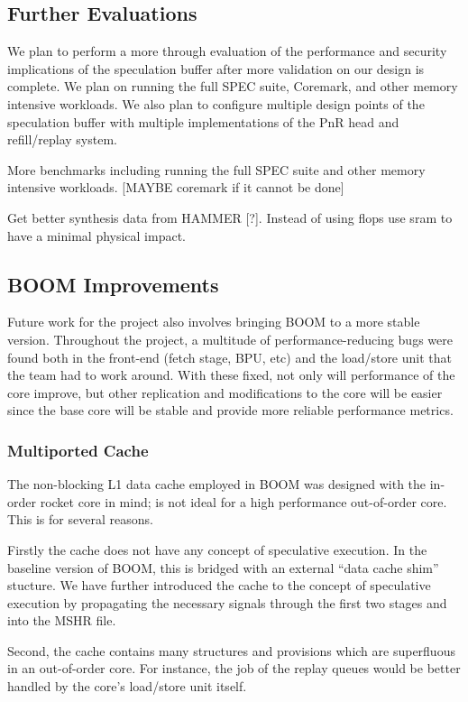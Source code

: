\subsection{Further Evaluations}
We plan to perform a more through evaluation of the performance and security implications of the
speculation buffer after more validation on our design is complete. We plan on running the full
SPEC suite, Coremark, and other memory intensive workloads. We also plan to configure multiple design
points of the speculation buffer with multiple implementations of the PnR head and refill/replay system.

More benchmarks including running the full SPEC suite and other memory intensive workloads. [MAYBE
coremark if it cannot be done]

Get better synthesis data from HAMMER [?]. Instead of using flops use sram to have a minimal 
physical impact.

\subsection{BOOM Improvements}

Future work for the project also involves bringing BOOM to a more stable version. Throughout
the project, a multitude of performance-reducing bugs were found both in the front-end (fetch stage, BPU, etc) and the 
load/store unit that the team had to work around. With these fixed, not only will performance
of the core improve, but other replication and modifications to the core will be easier since
the base core will be stable and provide more reliable performance metrics.

\subsubsection{Multiported Cache}
The non-blocking L1 data cache employed in BOOM was designed with the in-order rocket core in mind; is not ideal for
a high performance out-of-order core. This is for several reasons.

Firstly the cache does not have any concept of speculative execution.
In the baseline version of BOOM, this is bridged with an external ``data cache shim'' stucture. We have further introduced the cache to the
concept of speculative execution by propagating the necessary signals through the first two stages and into the MSHR file.

Second, the cache contains many structures and provisions which are superfluous in an out-of-order core.
For instance, the job of the replay queues would be better handled by the core's load/store unit itself.

